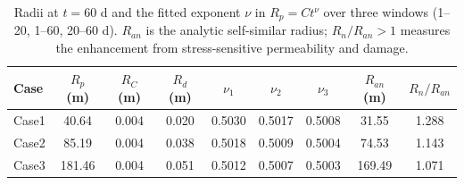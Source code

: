 \begin{table}[htbp]
\centering
\scriptsize
\setlength{\tabcolsep}{4pt}
\caption{Radii at $t=60$ d and the fitted exponent $\nu$ in $R_p=Ct^{\nu}$ over three windows (1--20, 1--60, 20--60 d). $R_{an}$ is the analytic self-similar radius; $R_{n}/R_{an}>1$ measures the enhancement from stress-sensitive permeability and damage.}
\label{tab:scaling}
\begin{tabular}{@{}lcccccccc@{}}
\toprule
Case & $R_p$ (m) & $R_C$ (m) & $R_d$ (m) & $\nu_1$ & $\nu_2$ & $\nu_3$ & $R_{an}$ (m) & $R_{n}/R_{an}$ \\
\midrule
Case1 & 40.64 & 0.004 & 0.020 & 0.5030 & 0.5017 & 0.5008 & 31.55 & 1.288 \\
Case2 & 85.19 & 0.004 & 0.038 & 0.5018 & 0.5009 & 0.5004 & 74.53 & 1.143 \\
Case3 & 181.46 & 0.004 & 0.051 & 0.5012 & 0.5007 & 0.5003 & 169.49 & 1.071 \\
\bottomrule
\end{tabular}
\end{table}
